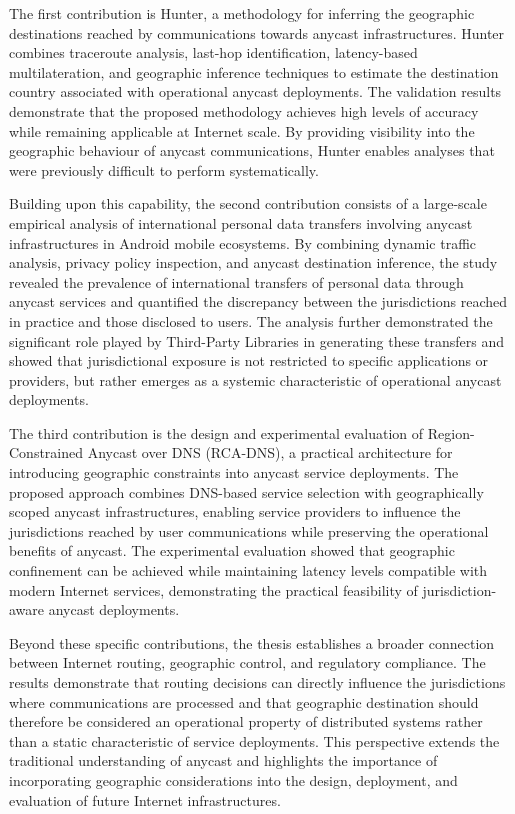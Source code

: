 The first contribution is Hunter, a methodology for inferring the geographic destinations reached by communications towards anycast infrastructures. Hunter combines traceroute analysis, last-hop identification, latency-based multilateration, and geographic inference techniques to estimate the destination country associated with operational anycast deployments. The validation results demonstrate that the proposed methodology achieves high levels of accuracy while remaining applicable at Internet scale. By providing visibility into the geographic behaviour of anycast communications, Hunter enables analyses that were previously difficult to perform systematically.

Building upon this capability, the second contribution consists of a large-scale empirical analysis of international personal data transfers involving anycast infrastructures in Android mobile ecosystems. By combining dynamic traffic analysis, privacy policy inspection, and anycast destination inference, the study revealed the prevalence of international transfers of personal data through anycast services and quantified the discrepancy between the jurisdictions reached in practice and those disclosed to users. The analysis further demonstrated the significant role played by Third-Party Libraries in generating these transfers and showed that jurisdictional exposure is not restricted to specific applications or providers, but rather emerges as a systemic characteristic of operational anycast deployments.

The third contribution is the design and experimental evaluation of Region-Constrained Anycast over DNS (RCA-DNS), a practical architecture for introducing geographic constraints into anycast service deployments. The proposed approach combines DNS-based service selection with geographically scoped anycast infrastructures, enabling service providers to influence the jurisdictions reached by user communications while preserving the operational benefits of anycast. The experimental evaluation showed that geographic confinement can be achieved while maintaining latency levels compatible with modern Internet services, demonstrating the practical feasibility of jurisdiction-aware anycast deployments.

Beyond these specific contributions, the thesis establishes a broader connection between Internet routing, geographic control, and regulatory compliance. The results demonstrate that routing decisions can directly influence the jurisdictions where communications are processed and that geographic destination should therefore be considered an operational property of distributed systems rather than a static characteristic of service deployments. This perspective extends the traditional understanding of anycast and highlights the importance of incorporating geographic considerations into the design, deployment, and evaluation of future Internet infrastructures.

